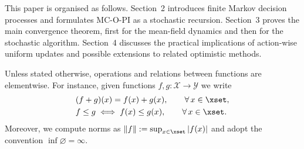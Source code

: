This paper is organised as follows. Section~2 introduces finite Markov decision
processes and formulates MC-O-PI as a stochastic recursion. Section~3 proves the
main convergence theorem, first for the mean-field dynamics and then for the stochastic
algorithm. Section~4 discusses the practical implications of action-wise uniform updates
and possible extensions to related optimistic methods. 

Unless stated otherwise, operations and relations between functions are elementwise. For instance, given functions $f, g : \mathcal X \to \mathcal Y$ we write
\begin{align*}
&(f + g)(x) = f(x) + g(x), \qquad \forall \, x \in \xset ,
    \\
&f \le g \iff f(x) \le g(x), \qquad \forall \, x \in \xset .
\end{align*}
Moreover, we compute norms as $\|f\| := \sup_{x \in \xset} |f(x)|$ 
and adopt the convention $\inf \varnothing = \infty$.

























































































